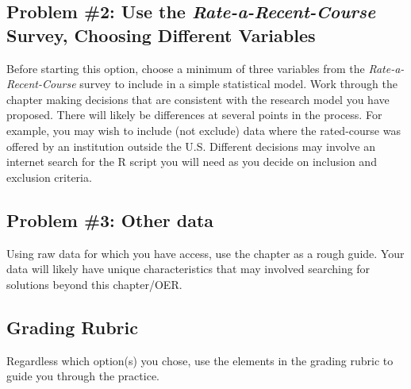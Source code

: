 \documentclass[
  11pt,
]{book}
\begin{document}
\hypertarget{problem-2-use-the-rate-a-recent-course-survey-choosing-different-variables}{%
\subsection{\texorpdfstring{Problem \#2: Use the \emph{Rate-a-Recent-Course} Survey, Choosing Different Variables}{Problem \#2: Use the Rate-a-Recent-Course Survey, Choosing Different Variables}}\label{problem-2-use-the-rate-a-recent-course-survey-choosing-different-variables}}

Before starting this option, choose a minimum of three variables from the \emph{Rate-a-Recent-Course} survey to include in a simple statistical model. Work through the chapter making decisions that are consistent with the research model you have proposed. There will likely be differences at several points in the process. For example, you may wish to include (not exclude) data where the rated-course was offered by an institution outside the U.S. Different decisions may involve an internet search for the R script you will need as you decide on inclusion and exclusion criteria.

\hypertarget{problem-3-other-data}{%
\subsection{Problem \#3: Other data}\label{problem-3-other-data}}

Using raw data for which you have access, use the chapter as a rough guide. Your data will likely have unique characteristics that may involved searching for solutions beyond this chapter/OER.

\hypertarget{grading-rubric}{%
\subsection{Grading Rubric}\label{grading-rubric}}

Regardless which option(s) you chose, use the elements in the grading rubric to guide you through the practice.
\end{document}
